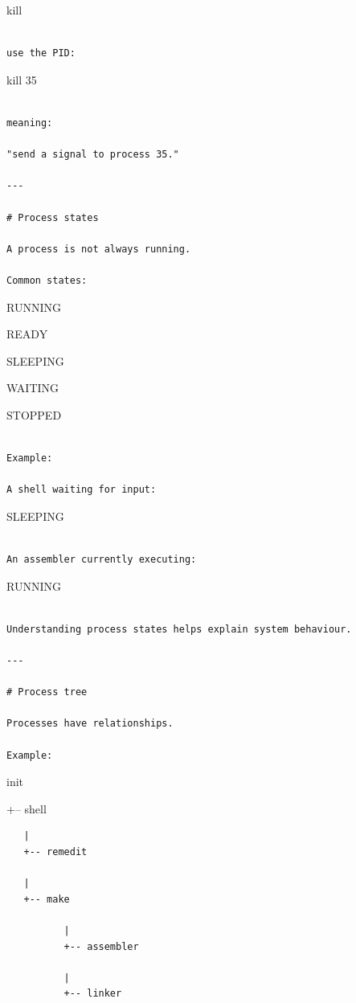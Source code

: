 \documentclass[
  oneside,
  openany]{book}
\begin{document}
kill

\begin{verbatim}

use the PID:
\end{verbatim}

kill 35

\begin{verbatim}

meaning:

"send a signal to process 35."

---

# Process states

A process is not always running.

Common states:
\end{verbatim}

RUNNING

READY

SLEEPING

WAITING

STOPPED

\begin{verbatim}

Example:

A shell waiting for input:
\end{verbatim}

SLEEPING

\begin{verbatim}

An assembler currently executing:
\end{verbatim}

RUNNING

\begin{verbatim}

Understanding process states helps explain system behaviour.

---

# Process tree

Processes have relationships.

Example:
\end{verbatim}

init

+-- shell

\begin{verbatim}
   |
   +-- remedit

   |
   +-- make

          |
          +-- assembler

          |
          +-- linker
\end{verbatim}
\end{document}
